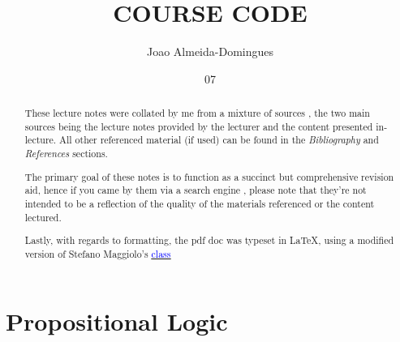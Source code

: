 \documentclass[english,course]{Notes}
\title{COURSE CODE}
\author{Joao Almeida-Domingues}
\date{07}{07}{1993}
\newcommand{\ita}[1]{\textit{#1}}
\begin{document}
\begin{abstract}
\par{These lecture notes were collated by me from a mixture of sources , the two main sources being the lecture notes provided by the lecturer and the content presented in-lecture. All other referenced material (if used) can be found in the \ita{Bibliography} and \ita{References} sections.}
\par{The primary goal of these notes is to function as a succinct but comprehensive revision aid, hence if you came by them via a search engine , please note that they're not intended to be a reflection of the quality of the materials referenced or the content lectured.}
\par{Lastly, with regards to formatting, the pdf doc was typeset in \LaTeX , using a modified version of Stefano Maggiolo's \href{http://blog.poormansmath.net/latex-class-for-lecture-notes/}{\underline{\textcolor{blue}{class}}}}
\end{abstract}

\newpage

\section{Propositional Logic}




\section{}

\section{}
\end{document}
